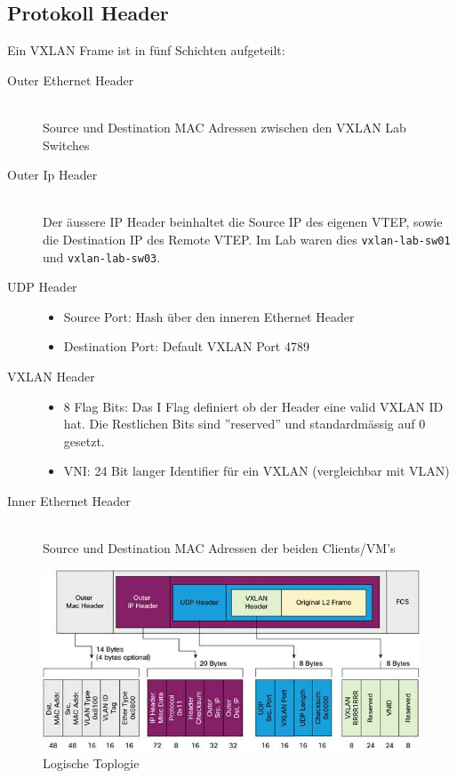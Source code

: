 \subsection{Protokoll Header}
Ein VXLAN Frame ist in fünf Schichten aufgeteilt:
\begin{description}
	\item[Outer Ethernet Header] \hfill \\
	Source und Destination MAC Adressen zwischen den VXLAN Lab Switches
	\item[Outer Ip Header] \hfill \\
	Der äussere IP Header beinhaltet die Source IP des eigenen VTEP, sowie die Destination IP des Remote VTEP. Im Lab waren dies \lstinline|vxlan-lab-sw01| und \lstinline|vxlan-lab-sw03|.
	\item[UDP Header] \hfill
	\begin{itemize}
		\item Source Port: Hash über den inneren Ethernet Header
		\item Destination Port: Default VXLAN Port 4789
	\end{itemize}
	\item[VXLAN Header] \hfill
	\begin{itemize}
		\item 8 Flag Bits: Das I Flag definiert ob der Header eine valid VXLAN ID hat. Die Restlichen Bits sind ''reserved'' und standardmässig auf 0 gesetzt.
		\item VNI: 24 Bit langer Identifier für ein VXLAN (vergleichbar mit VLAN)
	\end{itemize}
	\item[Inner Ethernet Header] \hfill \\
	Source und Destination MAC Adressen der beiden Clients/VM's
\end{description}

\begin{figure}[h]
	\centering
	\includegraphics[width=0.8\linewidth]{images/vxlan_header}
	\caption{Logische Toplogie}
	\label{fig:vxlanheader}
\end{figure}
\clearpage

